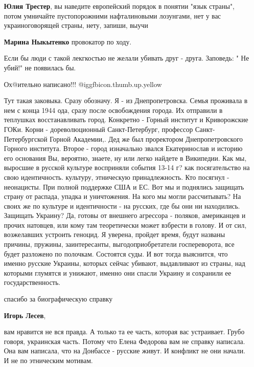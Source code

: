 \begin{itemize}
\begin{itemize}
\textbf{Юлия Трестер}, вы наведите европейский порядок в понятии "язык страны", потом умничайте пустопорожними нафталиновыми лозунгами, нет у вас украиноговорящей страны, нету, запиши, выучи

\textbf{Марина Ныкытенко} провокатор по ходу.

\end{itemize} %

Если бы люди с такой лекгкостью не желали убивать друг - друга. Заповедь: " Не убий!" не появилась бы.

Ох@ительно написано!!! @igg{fbicon.thumb.up.yellow} 


Тут такая заковыка. Сразу обозначу. Я - из Днепропетровска. Семья проживала в
нем с конца 1944 ода, сразу после освобождения города. Их отправили в теплушках
восстанавливать город. Конкретно - Горный институт и Криворожские ГОКи. Корни -
дореволюционный Санкт-Петербург, профессор Санкт-Петербургской Горной
Академии,. Дед же был проректором Днепропетровского Горного института. Второе -
город изначально звался Екатеринослав и историю его основания Вы, вероятно,
знаете, ну или легко найдете в Википедии. Как мы, выросшие в русской культуре
восприняли события 13-14 г? как посягательство на свою идентичность. культуру,
этническую принадлежность. Кто посягнул - неонацисты. При полной поддержке США
и ЕС. Вот мы и поднялись защищать страну от распада, упадка и уничтожения. На
кого мы могли рассчитывать? На своих же по культуре и идентичности - на
русских, где бы они ни находились. Защищать Украину? Да, готовы от внешнего
агрессора - поляков, американцев и прочих натовцев, или кому там теоретически
может взбрести в голову. И от сил, возжелавших устроить геноцид. Я уверена,
пройдет время, будут названы причины, пружины, заинтересанты,
выгодоприобретатели госпереворота, все будет разложено по полочкам. Состоятся
суды. И вот тогда выяснится, что именно русские Украины, которых сейчас
убивают, выдавливают из страны, над которыми глумятся и унижают, именно они
спасли Украину и сохранили ее государственность.

\begin{itemize} %
спасибо за биографическую справку

\textbf{Игорь Лесев}, 

вам нравится не вся правда. А только та ее часть, которая вас устраивает. Грубо
говоря, украинская часть. Потому что Елена Федорова вам не справку написала.
Она вам написала, что на Донбассе - русские живут. И конфликт не они начали. И
не по этническим мотивам.


\end{itemize}
\end{itemize}
